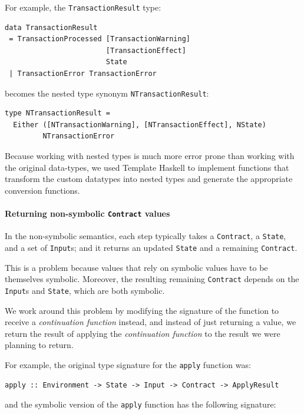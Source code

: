 \documentclass[runningheads]{llncs}
\begin{document}
\noindent
For example, the \texttt{TransactionResult} type:
\begin{verbatim}
data TransactionResult
 = TransactionProcessed [TransactionWarning]
                        [TransactionEffect]
                        State
 | TransactionError TransactionError
\end{verbatim}
\noindent
becomes the nested type synonym \texttt{NTransactionResult}:

\begin{verbatim}
type NTransactionResult =
  Either ([NTransactionWarning], [NTransactionEffect], NState)
         NTransactionError
\end{verbatim}

\noindent
Because working with nested types is much more error prone than working with the original data-types, we used Template Haskell \cite{sheard2002template} to implement functions that transform the custom datatypes into nested types and generate the appropriate conversion functions.

\paragraph{Returning non-symbolic \texttt{Contract} values}

In the non-symbolic semantics, each step typically takes a \texttt{Contract}, a \texttt{State}, and a set of \texttt{Input}s; and it returns an updated \texttt{State} and a remaining \texttt{Contract}. 

This is a problem because values that rely on symbolic values have to be themselves symbolic. Moreover,  the resulting remaining \texttt{Contract} depends on the \texttt{Input}s and \texttt{State}, which are both symbolic.

We work around this problem by  modifying the signature of the function to receive a \textit{continuation function} instead, and instead of just returning a value, we return the result of applying the \textit{continuation function} to the result we were planning to return.

For example, the original type signature for the \texttt{apply} function was:

\begin{verbatim}
apply :: Environment -> State -> Input -> Contract -> ApplyResult
\end{verbatim}

\noindent
and the symbolic version of the \texttt{apply} function has the following signature:
\end{document}
